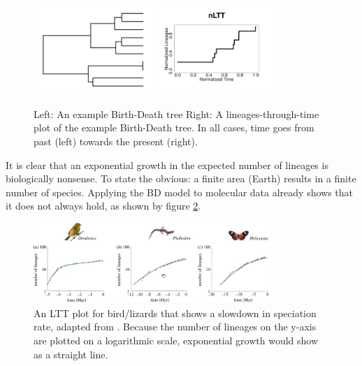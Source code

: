 \begin{figure}[H]
  \includegraphics[width=0.4\textwidth]{bd_tree.png}
  \includegraphics[width=0.4\textwidth]{bd_tree_nltt.png}
  \caption{
    Left: An example Birth-Death tree
    Right: A lineages-through-time plot of the example Birth-Death tree.
    In all cases, time goes from past (left) towards the present (right).
  }
  \label{fig:bd}
\end{figure}

It is clear that an exponential growth in the expected number of lineages
is biologically nonsense. 
To state the obvious: a finite area (Earth) results in a finite number of species. 
Applying the BD model to molecular data already shows that it does not
always hold, as shown by figure \ref{fig:bd}.

\begin{figure}[H]
  \includegraphics[width=0.8\textwidth]{etienne_et_al_2012_dd.png}
  \caption{
    An LTT plot for bird/lizards that shows a slowdown in speciation
    rate, adapted from \cite{etienne2012diversity}. Because the number
    of lineages on the y-axis are plotted on a logarithmic scale,
    exponential growth would show as a straight line. 
  }
  \label{fig:bd}
\end{figure}

